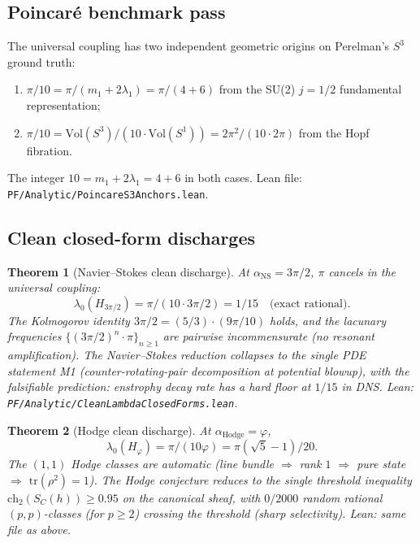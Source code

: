 \documentclass[11pt,a4paper]{article}
\newtheorem{theorem}{Theorem}[section]
\theoremstyle{definition}
\theoremstyle{remark}
\begin{document}
\subsection{Poincar\'e benchmark pass}\label{sec:poincare-benchmark}

The universal coupling has two independent geometric origins on
Perelman's $S^3$ ground truth:
\begin{enumerate}\itemsep0pt
\item $\pi/10 = \pi/(m_1 + 2\lambda_1) = \pi/(4 + 6)$ from the SU(2)
$j = 1/2$ fundamental representation;
\item $\pi/10 = \mathrm{Vol}(S^3)/(10\cdot \mathrm{Vol}(S^1)) =
2\pi^2 / (10 \cdot 2\pi)$ from the Hopf fibration.
\end{enumerate}
The integer $10 = m_1 + 2\lambda_1 = 4 + 6$ in both cases. Lean file:
\texttt{PF/Analytic/PoincareS3Anchors.lean}.

\subsection{Clean closed-form discharges}

\begin{theorem}[Navier--Stokes clean discharge]\label{thm:ns-clean}
At $\alpha_{\mathrm{NS}} = 3\pi/2$, $\pi$ cancels in the universal
coupling:
\[
\lambda_0(H_{3\pi/2}) = \pi / (10 \cdot 3\pi/2) = \boxed{1/15} \quad
\text{(exact rational)}.
\]
The Kolmogorov identity $3\pi/2 = (5/3)\cdot(9\pi/10)$ holds, and
the lacunary frequencies $\{(3\pi/2)^n \cdot \pi\}_{n \geq 1}$ are
pairwise incommensurate (no resonant amplification). The
Navier--Stokes reduction collapses to the single PDE statement M1
(counter-rotating-pair decomposition at potential blowup), with the
falsifiable prediction: enstrophy decay rate has a hard floor at $1/15$
in DNS. Lean: \texttt{PF/Analytic/CleanLambdaClosedForms.lean}.
\end{theorem}

\begin{theorem}[Hodge clean discharge]\label{thm:hodge-clean}
At $\alpha_{\mathrm{Hodge}} = \varphi$,
\[
\lambda_0(H_\varphi) = \pi / (10\varphi) = \boxed{\pi(\sqrt 5 - 1)/20}.
\]
The $(1,1)$ Hodge classes are automatic (line bundle $\Rightarrow$
rank $1$ $\Rightarrow$ pure state $\Rightarrow$ $\mathrm{tr}(\rho^2) = 1$).
The Hodge conjecture reduces to the single threshold inequality
$\mathrm{ch}_2(S_C(h)) \geq 0.95$ on the canonical sheaf, with
$0/2000$ random rational $(p,p)$-classes (for $p \geq 2$) crossing the
threshold (sharp selectivity). Lean: same file as above.
\end{theorem}
\end{document}
